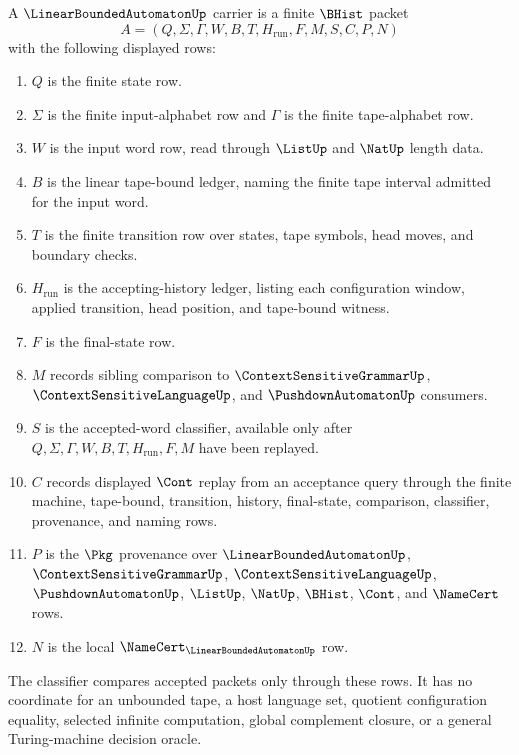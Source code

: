 \begin{definition}
\label{def:linear-bounded-automaton-carrier}
A $\LinearBoundedAutomatonUp$ carrier is a finite $\BHist$ packet
$$
A=(Q,\Sigma,\Gamma,W,B,T,H_{\mathrm{run}},F,M,S,C,P,N)
$$
with the following displayed rows:
\begin{enumerate}
\item $Q$ is the finite state row.
\item $\Sigma$ is the finite input-alphabet row and $\Gamma$ is the finite tape-alphabet row.
\item $W$ is the input word row, read through $\ListUp$ and $\NatUp$ length data.
\item $B$ is the linear tape-bound ledger, naming the finite tape interval admitted for the input word.
\item $T$ is the finite transition row over states, tape symbols, head moves, and boundary checks.
\item $H_{\mathrm{run}}$ is the accepting-history ledger, listing each configuration window, applied transition, head position, and tape-bound witness.
\item $F$ is the final-state row.
\item $M$ records sibling comparison to $\ContextSensitiveGrammarUp$, $\ContextSensitiveLanguageUp$, and $\PushdownAutomatonUp$ consumers.
\item $S$ is the accepted-word classifier, available only after $Q,\Sigma,\Gamma,W,B,T,H_{\mathrm{run}},F,M$ have been replayed.
\item $C$ records displayed $\Cont$ replay from an acceptance query through the finite machine, tape-bound, transition, history, final-state, comparison, classifier, provenance, and naming rows.
\item $P$ is the $\Pkg$ provenance over $\LinearBoundedAutomatonUp$, $\ContextSensitiveGrammarUp$, $\ContextSensitiveLanguageUp$, $\PushdownAutomatonUp$, $\ListUp$, $\NatUp$, $\BHist$, $\Cont$, and $\NameCert$ rows.
\item $N$ is the local $\NameCert_{\LinearBoundedAutomatonUp}$ row.
\end{enumerate}
The classifier compares accepted packets only through these rows. It has no coordinate for an unbounded tape, a host language set, quotient configuration equality, selected infinite computation, global complement closure, or a general Turing-machine decision oracle.
\end{definition}

